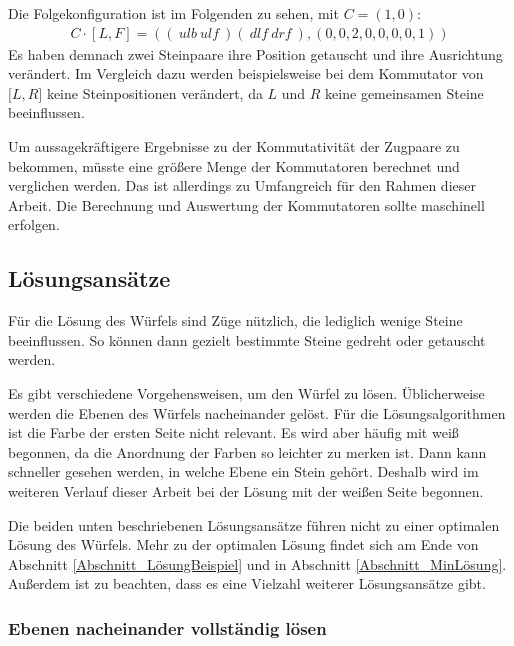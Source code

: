 \documentclass[12pt,a4paper, usenames, dvipsnames]{article}
\theoremstyle{mystyle}
\theoremstyle{definition}
\begin{document}
Die Folgekonfiguration ist im Folgenden zu sehen, mit $C=(1,0)$:
\begin{align*}
C \cdot [L, F] = (( \ \textit{ulb} \ \textit{ulf} \ )(\ \textit{dlf} \ \textit{drf} \ ), (0,0,2,0,0,0,0,1) )
\end{align*}
Es haben demnach zwei Steinpaare ihre Position getauscht und ihre Ausrichtung verändert. Im Vergleich dazu werden beispielsweise bei dem Kommutator von $\lbrack L, R \rbrack$ keine Steinpositionen verändert, da $L$ und $R$ keine gemeinsamen Steine beeinflussen.

Um aussagekräftigere Ergebnisse zu der Kommutativität der Zugpaare zu bekommen, müsste eine größere Menge der Kommutatoren berechnet und verglichen werden. Das ist allerdings zu Umfangreich für den Rahmen dieser Arbeit. Die Berechnung und Auswertung der Kommutatoren sollte maschinell erfolgen.

%
%
%
%
%
%
%
%
%
%
%
%
%
%
%
%
%
%
%
%
\subsection{Lösungsansätze}
\label{Abschnitt_Lösungsansätze}

Für die Lösung des Würfels sind Züge nützlich, die lediglich wenige Steine beeinflussen. So können dann gezielt bestimmte Steine gedreht oder getauscht werden. 

Es gibt verschiedene Vorgehensweisen, um den Würfel zu lösen. Üblicherweise werden die Ebenen des Würfels nacheinander gelöst. 
Für die Lösungsalgorithmen ist die Farbe der ersten Seite nicht relevant. Es wird aber häufig mit weiß begonnen, da die Anordnung der Farben so leichter zu merken ist. Dann kann schneller gesehen werden, in welche Ebene ein Stein gehört. \cite{RF} Deshalb wird im weiteren Verlauf dieser Arbeit bei der Lösung mit der weißen Seite begonnen.

Die beiden unten beschriebenen Lösungsansätze führen nicht zu einer optimalen Lösung des Würfels. Mehr zu der optimalen Lösung findet sich am Ende von Abschnitt \ref{Abschnitt_LösungBeispiel} und in Abschnitt \ref{Abschnitt_MinLösung}. Außerdem ist zu beachten, dass es eine Vielzahl weiterer Lösungsansätze gibt.

\subsubsection*{Ebenen nacheinander vollständig lösen}
\end{document}
